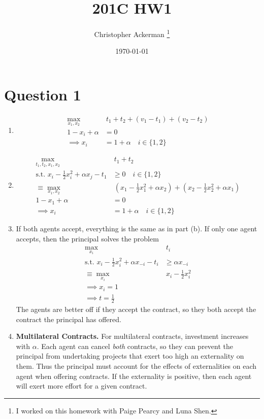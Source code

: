 

\title{201C HW1}
\author{Christopher Ackerman \thanks{I worked on this homework with Paige Pearcy and Luna Shen.}}
\date{\today}


\maketitle
\section{Question 1}
\begin{enumerate}[label=\alph*)]
\item
  \begin{align*}
    \max_{x_1, x_2} &\ t_1 + t_2 + (v_1 - t_1) + (v_2 - t_2)\\
    1 - x_i + \alpha &= 0 \tag{FOC for $i$}\\
    \implies x_i &= 1 + \alpha \quad i \in\{1, 2\}
  \end{align*}
\item
  \begin{align*}
    \max_{t_1, t_2, x_1, x_2} &\ t_1 + t_2\\
    \text{s.t. } x_i - \frac{1}{2} x_i^2 + \alpha x_j - t_1 &\ge 0 \quad i \in \{1, 2\} \tag{IR}\\
    \equiv \max_{x_1, x_2} &\ \left(x_1 - \frac{1}{2} x_1^2 + \alpha x_2\right) + \left(x_2 - \frac{1}{2}x_2^2 + \alpha x_1\right)\\
    1 - x_1 + \alpha &= 0 \tag{FOC for $i$}\\
    \implies x_i &= 1 + \alpha \quad i \in \{1, 2\}
  \end{align*}
\item
  If both agents accept, everything is the same as in part (b). If only one agent accepts, then the principal solves the problem
  \begin{align*}
    \max_{x_i}&\ t_i\\
    \text{s.t. } x_i - \frac{1}{2}x_i^2 + \alpha x_{-i} - t_i &\ge \alpha x_{-i}\\
    \equiv \max_{x_i}&\ x_i - \frac{1}{2}x_i^2\\
    \implies x_i = 1\\
    \implies t = \frac{1}{2}
  \end{align*}
  The agents are better off if they accept the contract, so they both accept the contract the principal has offered.

\item
  \textbf{Multilateral Contracts.}
  For multilateral contracts, investment increases with $\alpha$. Each agent can cancel \emph{both} contracts, so they can prevent the principal from undertaking projects that exert too high an externality on them. Thus the principal must account for the effects of externalities on each agent when offering contracts. If the externality is positive, then each agent will exert more effort for a given contract.


\end{enumerate}
